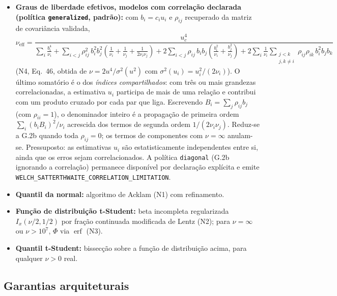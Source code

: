 \documentclass[11pt,a4paper]{article}
\begin{document}
\begin{itemize}
  \item \textbf{Graus de liberdade efetivos, modelos com correlação declarada (política \texttt{generalized}, padrão):} com \(b_i = c_i u_i\) e \(\rho_{ij}\) recuperado da matriz de covariância validada,
  \begin{equation*}
    \nu_{\text{eff}} = \frac{u_c^4}{\displaystyle \sum_i \frac{b_i^4}{\nu_i}
      + \sum_{i<j} \rho_{ij}^2\, b_i^2 b_j^2 \left(\frac{1}{\nu_i} + \frac{1}{\nu_j} + \frac{1}{2\nu_i\nu_j}\right)
      + 2 \sum_{i<j} \rho_{ij}\, b_i b_j \left(\frac{b_i^2}{\nu_i} + \frac{b_j^2}{\nu_j}\right)
      + 2 \sum_i \frac{1}{\nu_i} \sum_{\substack{j<k \\ j,k \neq i}} \rho_{ij}\rho_{ik}\, b_i^2 b_j b_k}
  \end{equation*}
  (N4, Eq.~46, obtida de \(\nu = 2u^4/\sigma^2(u^2)\) com \(\sigma^2(u_i) = u_i^2/(2\nu_i)\)). O último somatório é o dos \emph{índices compartilhados}: com três ou mais grandezas correlacionadas, a estimativa \(u_i\) participa de mais de uma relação e contribui com um produto cruzado por cada par que liga. Escrevendo \(B_i = \sum_j \rho_{ij} b_j\) (com \(\rho_{ii} = 1\)), o denominador inteiro é a propagação de primeira ordem \(\sum_i (b_i B_i)^2/\nu_i\) acrescida dos termos de segunda ordem \(1/(2\nu_i\nu_j)\). Reduz-se a G.2b quando toda \(\rho_{ij} = 0\); os termos de componentes com \(\nu = \infty\) anulam-se. Pressuposto: as estimativas \(u_i\) são estatisticamente independentes entre si, ainda que os erros sejam correlacionados. A política \texttt{diagonal} (G.2b ignorando a correlação) permanece disponível por declaração explícita e emite \texttt{WELCH\_SATTERTHWAITE\_CORRELATION\_LIMITATION}.
  \item \textbf{Quantil da normal:} algoritmo de Acklam (N1) com refinamento.
  \item \textbf{Função de distribuição t-Student:} beta incompleta regularizada \(I_x(\nu/2, 1/2)\) por fração continuada modificada de Lentz (N2); para \(\nu = \infty\) ou \(\nu > 10^{7}\), \(\Phi\) via \(\operatorname{erf}\) (N3).
  \item \textbf{Quantil t-Student:} bissecção sobre a função de distribuição acima, para qualquer \(\nu > 0\) real.
\end{itemize}

\subsection{Garantias arquiteturais}
\end{document}
